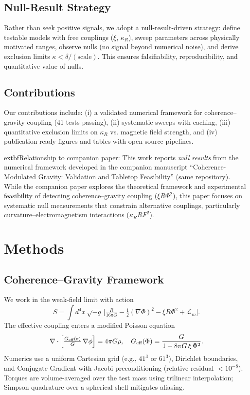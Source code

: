 \documentclass[10pt,twocolumn]{article}
\begin{document}
\subsection{Null-Result Strategy}
Rather than seek positive signals, we adopt a null-result-driven strategy: define testable models with free couplings ($\xi$, $\kappa_R$), sweep parameters across physically motivated ranges, observe nulls (no signal beyond numerical noise), and derive exclusion limits $\kappa < \delta/(\text{scale})$. This ensures falsifiability, reproducibility, and quantitative value of nulls.

\subsection{Contributions}
Our contributions include: (i) a validated numerical framework for coherence--gravity coupling (41 tests passing), (ii) systematic sweeps with caching, (iii) quantitative exclusion limits on $\kappa_R$ vs. magnetic field strength, and (iv) publication-ready figures and tables with open-source pipelines.

  extbf{Relationship to companion paper:} This work reports \emph{null results} from the numerical framework developed in the companion manuscript ``Coherence-Modulated Gravity: Validation and Tabletop Feasibility'' (same repository). While the companion paper explores the theoretical framework and experimental feasibility of detecting coherence--gravity coupling ($\xi R\Phi^2$), this paper focuses on systematic null measurements that constrain alternative couplings, particularly curvature--electromagnetism interactions ($\kappa_R R F^2$).

\section{Methods}
\subsection{Coherence--Gravity Framework}
We work in the weak-field limit with action
\begin{equation}
S = \int d^4x\,\sqrt{-g}\,\Big[\tfrac{R}{16\pi G} - \tfrac{1}{2}(\nabla\Phi)^2 - \xi R \Phi^2 + \mathcal{L}_m\Big].
\end{equation}
The effective coupling enters a modified Poisson equation
\begin{equation}
\nabla\cdot\Big[\tfrac{G_{\text{eff}}({\bf r})}{G}\,\nabla\phi\Big] = 4\pi G \rho,\quad G_{\text{eff}}(\Phi)=\frac{G}{1 + 8\pi G\,\xi\,\Phi^2}.
\end{equation}
Numerics use a uniform Cartesian grid (e.g., $41^3$ or $61^3$), Dirichlet boundaries, and Conjugate Gradient with Jacobi preconditioning (relative residual $<10^{-8}$). Torques are volume-averaged over the test mass using trilinear interpolation; Simpson quadrature over a spherical shell mitigates aliasing.
\end{document}
